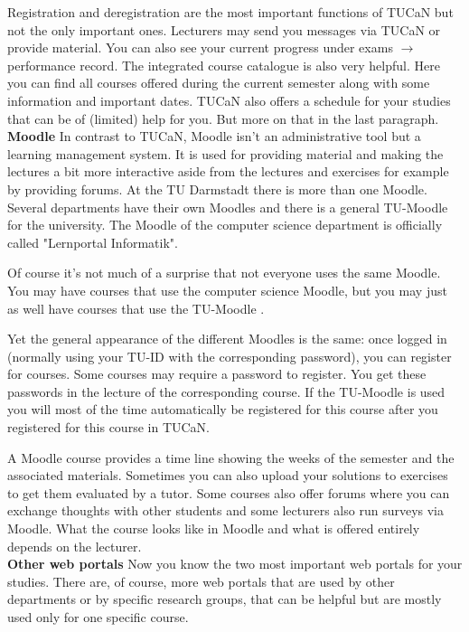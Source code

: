 {\begin{multicols}{2}
Registration and deregistration are the most important functions of TUCaN but not the only important ones. Lecturers may send you messages via TUCaN or provide material. You can also see your current progress under exams $\rightarrow$ performance record. The integrated course catalogue is also very helpful. Here you can find all courses offered during the current semester along with some information and important dates. TUCaN also offers a schedule for your studies that can be of (limited) help for you. But more on that in the last paragraph.\\

\noindent\textbf{Moodle}
In contrast to TUCaN, Moodle isn't an administrative tool but a learning management system. It is used for providing material and making the lectures a bit more interactive aside from the lectures and exercises for example by providing forums. At the TU Darmstadt there is more than one Moodle. Several departments have their own Moodles and there is a general TU-Moodle for the university. The Moodle of the computer science department \footnotemark[2] is officially called "Lernportal Informatik".

Of course it's not much of a surprise that not everyone uses the same Moodle. You may have courses that use the computer science Moodle, but you may just as well have courses that use the TU-Moodle \footnotemark[3].

Yet the general appearance of the different Moodles is the same: once logged in (normally using your TU-ID with the corresponding password), you can register for courses. Some courses may require a password to register. You get these passwords in the lecture of the corresponding course. If the TU-Moodle is used you will most of the time automatically be registered for this course after you registered for this course in TUCaN.

A Moodle course provides a time line showing the weeks of the semester and the associated materials. Sometimes you can also upload your solutions to exercises to get them evaluated by a tutor. Some courses also offer forums where you can exchange thoughts with other students and some lecturers also run surveys via Moodle. What the course looks like in Moodle and what is offered entirely depends on the lecturer.\\

\noindent\textbf{Other web portals}
Now you know the two most important web portals for your studies. There are, of course, more web portals that are used by other departments or by specific research groups, that can be helpful but are mostly used only for one specific course.


\end{multicols}}
